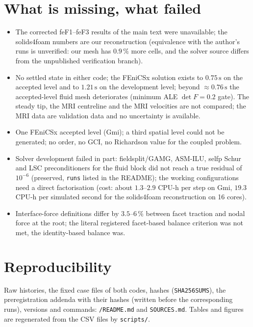\documentclass[sn-mathphys,Numbered]{sn-jnl}
\newcommand{\data}{\detokenize{paper-data/fenicsx_hessenthaler}}
\begin{document}
\section{What is missing, what failed}\label{sec:limits}
\begin{itemize}
\item The corrected feF1--feF3 results of the main text were unavailable; the solids4foam numbers are our reconstruction (equivalence with the author's runs is unverified: our mesh has $0.9\,\%$ more cells, and the solver source differs from the unpublished verification branch).
\item No settled state in either code; the FEniCSx solution exists to $0.75\,\mathrm{s}$ on the accepted level and to $1.21\,\mathrm{s}$ on the development level; beyond $\approx0.76\,\mathrm{s}$ the accepted-level fluid mesh deteriorates (minimum ALE $\det F=0.2$ gate). The steady tip, the MRI centreline and the MRI velocities are not compared; the MRI data are validation data and no uncertainty is available.
\item One FEniCSx accepted level (Gmi); a third spatial level could not be generated; no order, no GCI, no Richardson value for the coupled problem.
\item Solver development failed in part: fieldsplit/GAMG, ASM-ILU, selfp Schur and LSC preconditioners for the fluid block did not reach a true residual of $10^{-6}$ (preserved, \texttt{runs} listed in the README); the working configurations need a direct factorisation (cost: about $1.3$--$2.9$ CPU-h per step on Gmi, $19.3$ CPU-h per simulated second for the solids4foam reconstruction on 16 cores).
\item Interface-force definitions differ by $3.5$--$6\,\%$ between facet traction and nodal force at the root; the literal registered facet-based balance criterion was not met, the identity-based balance was.
\end{itemize}

\section{Reproducibility}
Raw histories, the fixed case files of both codes, hashes (\texttt{SHA256SUMS}), the preregistration addenda with their hashes (written before the corresponding runs), versions and commands: \texttt{\data/README.md} and \texttt{SOURCES.md}. Tables and figures are regenerated from the CSV files by \texttt{scripts/}.
\end{document}

